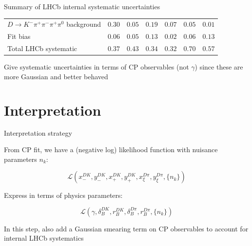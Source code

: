 \documentclass[xcolor={dvipsnames}]{beamer}
\begin{document}
\begin{frame}{Summary of LHCb internal systematic uncertainties}
\begin{center}
\begin{tabular}{lcccccc}
        $D\to K^-\pi^+\pi^-\pi^+\pi^0$ background                  & $0.30$ & $0.05$ & $0.19$ & $0.07$ & $0.05$ & $0.01$ \\
        Fit bias                                                   & $0.06$ & $0.05$ & $0.13$ & $0.02$ & $0.06$ & $0.13$ \\
        \hline
        Total LHCb systematic                                      & $0.37$ & $0.43$ & $0.34$ & $0.32$ & $0.70$ & $0.57$ \\
        \hline
    \end{tabular}
  \end{center}
  \begin{center}
    {\normalsize Give systematic uncertainties in terms of CP observables (not $\gamma$) since these are more Gaussian and better behaved}
  \end{center}
\end{frame}

\section{Interpretation}
\begin{frame}{Interpretation strategy}
  \begin{center}
    {\large From CP fit, we have a (negative log) likelihood function with nuisance parameters $n_k$:}
  \end{center}
  \begin{equation*}
    \mathcal{L}(x_-^{DK}, y_-^{DK}, x_+^{DK}, y_+^{DK}, x_\xi^{D\pi}, y_\xi^{D\pi}, \{n_k\})
  \end{equation*}
  \vspace{0.1cm}
  \begin{center}
    {\large Express in terms of physics parameters:}
  \end{center}
  \begin{equation*}
    \mathcal{L}(\gamma, \delta_B^{DK}, r_B^{DK}, \delta_B^{D\pi}, r_B^{D\pi}, \{n_k\})
  \end{equation*}
  \vspace{0.1cm}
  \begin{center}
    {\normalsize In this step, also add a Gaussian smearing term on CP observables to account for internal LHCb systematics}
  \end{center}
\end{frame}
\end{document}

